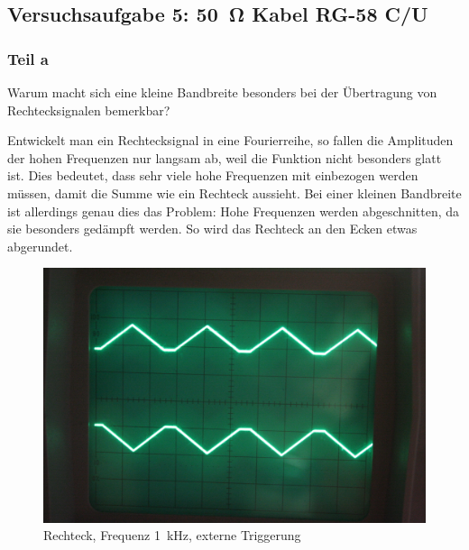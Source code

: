 \FloatBarrier
\subsection{Versuchsaufgabe 5: \SI{50}{\ohm} Kabel RG-58 C/U}

\subsubsection{Teil a}

\begin{problem}
	Warum macht sich eine kleine Bandbreite besonders bei der Übertragung von
	Rechtecksignalen bemerkbar?
\end{problem}

Entwickelt man ein Rechtecksignal in eine Fourierreihe, so fallen die
Amplituden der hohen Frequenzen nur langsam ab, weil die Funktion nicht
besonders glatt ist. Dies bedeutet, dass sehr viele hohe Frequenzen mit
einbezogen werden müssen, damit die Summe wie ein Rechteck aussieht. Bei einer
kleinen Bandbreite ist allerdings genau dies das Problem: Hohe Frequenzen
werden abgeschnitten, da sie besonders gedämpft werden. So wird das Rechteck an
den Ecken etwas abgerundet.

\begin{figure}
	\centering
	\begin{minipage}{.45\linewidth}
	\end{minipage}
	\hfill
	\begin{minipage}{.45\linewidth}
	\includegraphics[width=\linewidth]{Fotos/IMG_0776-1500.jpg}
	\end{minipage}
	\caption{%
		Rechteck, Frequenz \SI{1}{\kilo\hertz},
		externe Triggerung
	}
	\label{fig:0776}
\end{figure}


